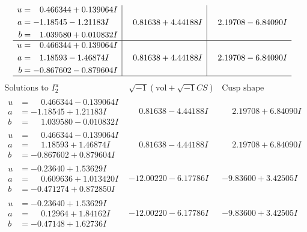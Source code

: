\documentclass[1p]{elsarticle_modified}
\theoremstyle{definition}
\newcommand{\I}{\sqrt{-1}}
\begin{document}
$$\begin{array}{c|c|c}
\begin{aligned}
u &= \phantom{-}0.466344 + 0.139064 I \\
a &= -1.18545 - 1.21183 I \\
b &= \phantom{-}1.039580 + 0.010832 I\end{aligned}
 & \phantom{-}0.81638 + 4.44188 I & \phantom{-}2.19708 - 6.84090 I \\ \hline\begin{aligned}
u &= \phantom{-}0.466344 + 0.139064 I \\
a &= \phantom{-}1.18593 - 1.46874 I \\
b &= -0.867602 - 0.879604 I\end{aligned}
 & \phantom{-}0.81638 + 4.44188 I & \phantom{-}2.19708 - 6.84090 I\\
 \hline 
 \end{array}$$\newpage$$\begin{array}{c|c|c}  
\text{Solutions to }I^u_{2}& \I (\text{vol} + \sqrt{-1}CS) & \text{Cusp shape}\\
 \hline 
\begin{aligned}
u &= \phantom{-}0.466344 - 0.139064 I \\
a &= -1.18545 + 1.21183 I \\
b &= \phantom{-}1.039580 - 0.010832 I\end{aligned}
 & \phantom{-}0.81638 - 4.44188 I & \phantom{-}2.19708 + 6.84090 I \\ \hline\begin{aligned}
u &= \phantom{-}0.466344 - 0.139064 I \\
a &= \phantom{-}1.18593 + 1.46874 I \\
b &= -0.867602 + 0.879604 I\end{aligned}
 & \phantom{-}0.81638 - 4.44188 I & \phantom{-}2.19708 + 6.84090 I \\ \hline\begin{aligned}
u &= -0.23640 + 1.53629 I \\
a &= \phantom{-}0.609636 + 1.013420 I \\
b &= -0.471274 + 0.872850 I\end{aligned}
 & -12.00220 - 6.17786 I & -9.83600 + 3.42505 I \\ \hline\begin{aligned}
u &= -0.23640 + 1.53629 I \\
a &= \phantom{-}0.12964 + 1.84162 I \\
b &= -0.47148 + 1.62736 I\end{aligned}
 & -12.00220 - 6.17786 I & -9.83600 + 3.42505 I \\ \hline\begin{aligned}

\end{aligned}
\end{array}$$
\end{document}
